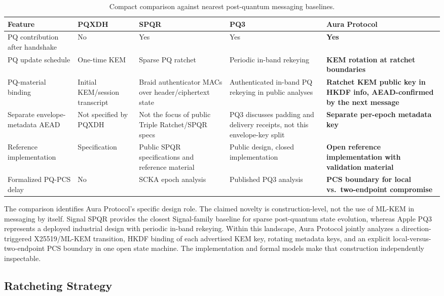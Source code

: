 \documentclass[preprint,12pt]{elsarticle}
\theoremstyle{definition}
\newcommand{\tech}[1]{\textnormal{#1}}
\newcommand{\SPQR}{\tech{SPQR}}
\newcommand{\PQThree}{\tech{PQ3}}
\begin{document}
\begin{table}[H]
\centering
\caption{Compact comparison against nearest post-quantum messaging baselines.}
\label{tab:comparison}
\scriptsize
\begin{tabularx}{\textwidth}{@{}L{0.22\textwidth}YYYY@{}}
\toprule
Feature & PQXDH & \SPQR{} & \PQThree{} & \textbf{Aura Protocol} \\
\midrule
PQ contribution after handshake & No & Yes & Yes & \textbf{Yes} \\
PQ update schedule & One-time KEM & Sparse PQ ratchet & Periodic in-band rekeying & \textbf{KEM rotation at ratchet boundaries} \\
PQ-material binding & Initial KEM/session transcript & Braid authenticator MACs over header/ciphertext state & Authenticated in-band PQ rekeying in public analyses & \textbf{Ratchet KEM public key in HKDF info, AEAD-confirmed by the next message} \\
Separate envelope-metadata AEAD & Not specified by PQXDH & Not the focus of public Triple Ratchet/SPQR specs & PQ3 discusses padding and delivery receipts, not this envelope-key split & \textbf{Separate per-epoch metadata key} \\
Reference implementation & Specification & Public SPQR specifications and reference material & Public design, closed implementation & \textbf{Open reference implementation with validation material} \\
Formalized PQ-PCS delay & No & SCKA epoch analysis & Published PQ3 analysis & \textbf{PCS boundary for local vs.\ two-endpoint compromise} \\
\bottomrule
\end{tabularx}
\end{table}

The comparison identifies Aura Protocol's specific design role. The claimed
novelty is construction-level, not the use of ML-KEM in messaging by itself.
Signal \SPQR{} provides the closest Signal-family baseline for sparse
post-quantum state evolution, whereas Apple \PQThree{} represents a deployed
industrial design with periodic in-band rekeying. Within this landscape, Aura
Protocol jointly analyzes a direction-triggered X25519/ML-KEM transition,
HKDF binding of each advertised KEM key, rotating metadata keys, and an explicit
local-versus-two-endpoint PCS boundary in one open state machine. The
implementation and formal models make that construction independently
inspectable.

\subsection{Ratcheting Strategy}
\end{document}
